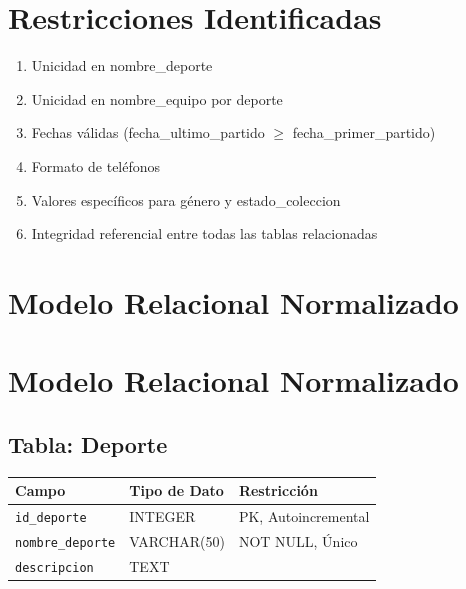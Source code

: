 \documentclass{article}
\begin{document}
\section{Restricciones Identificadas}

\begin{enumerate}
    \item Unicidad en nombre\_deporte
    \item Unicidad en nombre\_equipo por deporte
    \item Fechas válidas (fecha\_ultimo\_partido $\geq$ fecha\_primer\_partido)
    \item Formato de teléfonos
    \item Valores específicos para género y estado\_coleccion
    \item Integridad referencial entre todas las tablas relacionadas
\end{enumerate}





\vspace{5mm}

\section{Modelo Relacional Normalizado}
\section*{Modelo Relacional Normalizado}

\subsection*{Tabla: Deporte}
\begin{center}
\begin{tabular}{|l|l|p{6cm}|}
\hline
\textbf{Campo} & \textbf{Tipo de Dato} & \textbf{Restricción} \\
\hline
\texttt{id\_deporte} & INTEGER & PK, Autoincremental \\
\texttt{nombre\_deporte} & VARCHAR(50) & NOT NULL, Único \\
\texttt{descripcion} & TEXT &  \\
\hline
\end{tabular}
\end{center}

\end{document}
